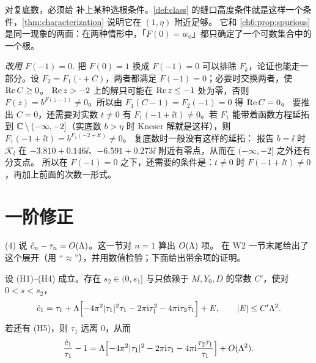 \begin{remark}
对复底数，必须给 \cite[Prop.~2]{Paulsen2019} 补上某种选根条件。\cref{def:class} 的缝口高度条件就是这样一个条件，\cref{thm:characterization} 说明它在 $(1,\eta)$ 附近足够。
它和 \cref{ch6:prop:spurious} 是同一现象的两面：在两种情形中，「$F(0)=w_0$」都只确定了一个可数集合中的一个根。

\emph{改用 $F(-1)=0$.} 把 $F(0)=1$ 换成 $F(-1)=0$ 可以排除 $F_k$，论证也能走一部分。设 $F_2=F_1(\cdot+C)$，两者都满足 $F(-1)=0$；必要时交换两者，使 $\operatorname{Re} C\ge0$。
$\operatorname{Re} z>-2$ 上的解只可能在 $\operatorname{Re} z\le-1$ 处为零，否则 $F(z)=b^{F(z-1)}\ne0$。所以由 $F_1(C-1)=F_2(-1)=0$ 得 $\operatorname{Re} C=0$。
要推出 $C=0$，还需要对实数 $t\ne0$ 有 $F_1(-1+\ii t)\ne0$。若 $F_1$ 能带着函数方程延拓到 $\mathbb{C}\setminus(-\infty,-2]$（实底数 $b>\eta$ 时 Kneser 解就是这样），则 $F_1(-1+\ii t)=b^{F_1(-2+\ii t)}\ne0$。
复底数时一般没有这样的延拓：\cite{Paulsen2019} 报告 $b=\ii$ 时 $\mathcal K_\ii$ 在 $-3.810+0.146\ii$、$-6.591+0.273\ii$ 附近有零点，从而在 $(-\infty,-2]$ 之外还有分支点。
所以在 $F(-1)=0$ 之下，还需要的条件是：$t\ne0$ 时 $F(-1+\ii t)\ne0$，再加上前面的次数一形式。
\end{remark}

\section{一阶修正}\label{ch6:sec:first-correction}

(4) 说 $\hat c_n-\tau_n=O(\Lambda)$。这一节对 $n=1$ 算出 $O(\Lambda)$ 项。
\cite{KneserPaper} 在 W2 一节末尾给出了这个展开（用 ``$\approx$''），并用数值检验；下面给出带余项的证明。

\begin{proposition}[一阶修正]\label{ch6:prop:first-correction}
设 \textup{(H1)--(H4)} 成立。存在 $s_2\in(0,s_1]$ 与只依赖于 $M,Y_0,D$ 的常数 $C'$，使对 $0<s<s_2$，
\[
 \hat c_1=\tau_1+\Lambda\Bigl[-4\pi^2|\tau_1|^2\tau_1-2\pi\mathrm{i}\tau_1^2-4\pi\mathrm{i}\tau_2\bar\tau_1\Bigr]+E,\qquad|E|\le C'\Lambda^2 .
\]
若还有 \textup{(H5)}，则 $\tau_1$ 远离 $0$，从而
\begin{equation}\label{ch6:eq:first-correction}
 \frac{\hat c_1}{\tau_1}-1=\Lambda\Bigl[-4\pi^2|\tau_1|^2-2\pi\mathrm{i}\tau_1-4\pi\mathrm{i}\frac{\tau_2\bar\tau_1}{\tau_1}\Bigr]+O(\Lambda^2).
\end{equation}
\end{proposition}

